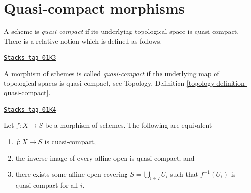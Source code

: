 \section{Quasi-compact morphisms}
\label{schemes-section-quasi-compact}
A scheme is {\it quasi-compact} if its underlying topological space is
quasi-compact. There is a relative notion which is defined as follows.

\begin{definition}
\label{schemes-definition-quasi-compact}
\href{https://stacks.math.columbia.edu/tag/01K3}{\texttt{Stacks tag 01K3}}

A morphism of schemes is called {\it quasi-compact}
if the underlying map of topological spaces is
quasi-compact, see
Topology, Definition \ref{topology-definition-quasi-compact}.
\end{definition}

\begin{lemma}
\label{schemes-lemma-quasi-compact-affine}
\href{https://stacks.math.columbia.edu/tag/01K4}{\texttt{Stacks tag 01K4}}

Let $f : X \to S$ be a morphism of schemes.
The following are equivalent
\begin{enumerate}
\item $f : X \to S$ is quasi-compact,
\item the inverse image of every affine open is quasi-compact, and
\item there exists some affine open covering $S = \bigcup_{i \in I} U_i$
such that $f^{-1}(U_i)$ is quasi-compact for all $i$.
\end{enumerate}
\end{lemma}

